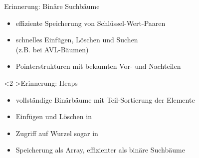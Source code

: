 \begin{frame}
    \begin{block}{Erinnerung: Binäre Suchbäume}
        \begin{itemize}
            \item effiziente Speicherung von Schlüssel-Wert-Paaren
            \item schnelles Einfügen, Löschen und Suchen\\
                  (z.B. \alert{\olog} bei AVL-Bäumen)
            \item Pointerstrukturen mit bekannten Vor- und Nachteilen
        \end{itemize}
    \end{block}

    \begin{block}<2->{Erinnerung: Heaps}
        \begin{itemize}
            \item vollständige Binärbäume mit Teil-Sortierung der Elemente
            \item Einfügen und Löschen in \alert{\olog}
            \item Zugriff auf Wurzel sogar in \alert{\oconst}
            \item Speicherung als Array, effizienter als binäre Suchbäume
        \end{itemize}
    \end{block}
\end{frame}

